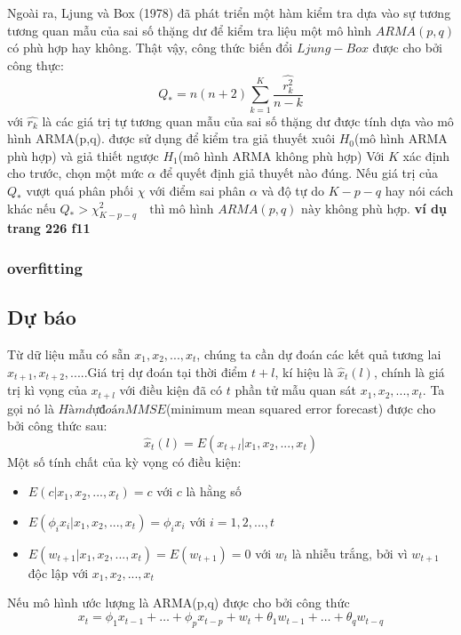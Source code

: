 \documentclass[twoside,12pt]{Latex/Classes/PhDthesisPSnPDF}
\begin{document}
Ngoài ra, Ljung và Box (1978) đã phát triển một hàm kiểm tra dựa vào sự tương tương quan mẫu của sai số thặng dư để kiểm tra liệu một mô hình $ARMA(p,q)$ có phù hợp hay không. 
Thật vậy, công thức biến đổi $Ljung-Box$ được cho bởi công thực:
\begin{equation}
Q_* = n(n+2)\sum\limits^{K}_{k=1}\frac{\hat{r_k^2}}{n-k}
\end{equation}
với $\hat{r_k}$ là các giá trị tự tương quan mẫu của sai số thặng dư được tính dựa vào mô hình ARMA(p,q).
được sử dụng để kiểm tra giả thuyết xuôi $H_0$(mô hình ARMA phù hợp) và giả thiết ngược $H_1$(mô hình ARMA không phù hợp)
Với $K$ xác định cho trước, chọn một mức $\alpha$ để quyết định giả thuyết nào đúng. Nếu giá trị của $Q_*$ vượt quá phân phối $\chi$ với điểm sai phân $\alpha$ và độ tự do $K-p-q$ hay nói cách khác nếu \quad
	$Q_{*} > \chi^2_{K-p-q} \quad\text{thì mô hình $ARMA(p,q)$ này không phù hợp.}$
\textbf{ ví dụ trang 226 f11}
\subsubsection{overfitting}

\subsection{Dự báo}

Từ dữ liệu mẫu có sẵn $x_1,x_2,...,x_t$, chúng ta cần dự đoán các kết quả tương lai $x_{t+1},x_{t+2},....$.Giá trị dự đoán tại thời điểm $t+l$, kí hiệu là $\hat{x}_t(l)$, chính là giá trị kì vọng của $x_{t+l}$ với điều kiện đã có $t$ phần tử mẫu quan sát $x_1,x_2,...,x_t$. Ta gọi nó là $Hàm dự đoán MMSE$(minimum mean squared error forecast) được cho bởi công thức sau:
\begin{equation}
	\hat{x}_t(l) = E(x_{t+l}|x_1,x_2,...,x_t)
\end{equation}
Một số tính chất của kỳ vọng có điều kiện:
\begin{itemize}
\item $E(c|x_1,x_2,...,x_t) = c $ với $c$ là hằng số
\item $E(\phi_i{x_i}|x_1,x_2,...,x_t) = \phi_i x_i$ với $i = 1,2,...,t$
\item $E(w_{t+1}|x_1,x_2,...,x_t) = E(w_{t+1}) = 0$ với ${w_t}$ là nhiễu trắng, bởi vì $w_{t+1}$ độc lập với $x_1,x_2,...,x_t$
\end{itemize}

Nếu mô hình ước lượng là ARMA(p,q) được cho bởi công thức
\begin{equation}
	x_t = \phi_1x_{t-1}+\dots+\phi_px_{t-p}+w_t+\theta_1w_{t-1}+\dots+\theta_qw_{t-q}
\end{equation}
\end{document}
